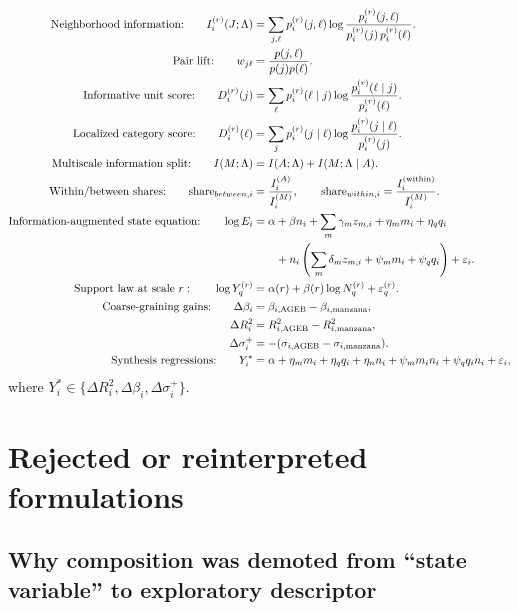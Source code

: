 \documentclass[11pt]{article}
\begin{document}
\begin{align}
\text{Neighborhood information:}\qquad
I_i^{(r)}(J;\Lambda)
&=
\sum_{j,\ell}
p_i^{(r)}(j,\ell)
\log\frac{p_i^{(r)}(j,\ell)}{p_i^{(r)}(j)\,p_i^{(r)}(\ell)}.\\
\text{Pair lift:}\qquad
w_{j\ell}
&=
\frac{p(j,\ell)}{p(j)p(\ell)}.\\
\text{Informative unit score:}\qquad
D_i^{(r)}(j)
&=
\sum_\ell p_i^{(r)}(\ell\mid j)\log\frac{p_i^{(r)}(\ell\mid j)}{p_i^{(r)}(\ell)}.\\
\text{Localized category score:}\qquad
D_i^{(r)}(\ell)
&=
\sum_j p_i^{(r)}(j\mid \ell)\log\frac{p_i^{(r)}(j\mid \ell)}{p_i^{(r)}(j)}.\\
\text{Multiscale information split:}\qquad
I(M;\Lambda)
&=
I(A;\Lambda)+I(M;\Lambda\mid A).\\
\text{Within/between shares:}\qquad
\text{share}_{between,i}
&=
\frac{I_i^{(A)}}{I_i^{(M)}},
\qquad
\text{share}_{within,i}
=
\frac{I_i^{(\mathrm{within})}}{I_i^{(M)}}.\\
\text{Information-augmented state equation:}\qquad
\log E_i
&=
\alpha+\beta n_i+\sum_m\gamma_m z_{m,i}
+\eta_m m_i+\eta_q q_i \notag\\
&\qquad
+ n_i\left(\sum_m\delta_m z_{m,i}+\psi_m m_i+\psi_q q_i\right)
+ \varepsilon_i.\\
\text{Support law at scale } r:\qquad
\log Y_q^{(r)}
&=
\alpha(r)+\beta(r)\log N_q^{(r)}+\varepsilon_q^{(r)}.\\
\text{Coarse-graining gains:}\qquad
\Delta\beta_i
&=
\beta_{i,\mathrm{AGEB}}-\beta_{i,\mathrm{manzana}},\\
\Delta R_i^2
&=
R^2_{i,\mathrm{AGEB}}-R^2_{i,\mathrm{manzana}},\\
\Delta \sigma_i^{+}
&=
-(\sigma_{i,\mathrm{AGEB}}-\sigma_{i,\mathrm{manzana}}).\\
\text{Synthesis regressions:}\qquad
Y_i^\ast
&=
\alpha+\eta_m m_i+\eta_q q_i+\eta_n n_i+\psi_m m_i n_i+\psi_q q_i n_i+\varepsilon_i,
\end{align}
\noindent
where \(Y_i^\ast\in\{\Delta R_i^2,\Delta\beta_i,\Delta \sigma_i^{+}\}\).

\section{Rejected or reinterpreted formulations}

\subsection{Why composition was demoted from ``state variable'' to exploratory descriptor}
\end{document}
